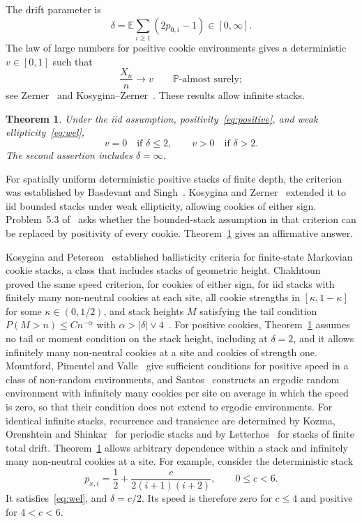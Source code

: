 \documentclass[11pt]{amsart}
\numberwithin{equation}{section}
\newtheorem{theorem}{Theorem}[section]
\theoremstyle{remark}
\newcommand{\E}{\mathbb E}
\newcommand{\Pp}{\mathbb P}
\begin{document}
The drift parameter is
\begin{equation}\label{eq:delta}
 \delta=\E\sum_{i\ge1}(2p_{0,i}-1)\in[0,\infty].
\end{equation}
The law of large numbers for positive cookie environments gives a deterministic $v\in[0,1]$ such that
\begin{equation}\label{eq:lln}
 \frac{X_n}{n}\longrightarrow v\qquad\Pp\text{-almost surely};
\end{equation}
see Zerner~\cite[Theorem~13]{Zerner05} and Kosygina--Zerner~\cite[Theorem~4.1]{KZ13}. These results allow infinite stacks.

\begin{theorem}\label{thm:main}
Under the iid assumption, positivity~\eqref{eq:positive}, and weak ellipticity~\eqref{eq:wel},
\[
 v=0\quad\text{if }\delta\le2,
 \qquad
 v>0\quad\text{if }\delta>2.
\]
The second assertion includes $\delta=\infty$.
\end{theorem}

For spatially uniform deterministic positive stacks of finite depth, the criterion was established by Basdevant and Singh~\cite{BS08}. Kosygina and Zerner~\cite[Theorem~2]{KZ08} extended it to iid bounded stacks under weak ellipticity, allowing cookies of either sign. Problem~5.3 of~\cite{KZ13} asks whether the bounded-stack assumption in that criterion can be replaced by positivity of every cookie. Theorem~\ref{thm:main} gives an affirmative answer.

Kosygina and Peterson~\cite{KP17} established ballisticity criteria for finite-state Markovian cookie stacks, a class that includes stacks of geometric height. Chakhtoun~\cite[Theorem~2.2]{Chakhtoun19} proved the same speed criterion, for cookies of either sign, for iid stacks with finitely many non-neutral cookies at each site, all cookie strengths in $[\kappa,1-\kappa]$ for some $\kappa\in(0,1/2)$, and stack heights $M$ satisfying the tail condition $P(M>n)\le Cn^{-\alpha}$ with $\alpha>|\delta|\vee4$~\cite[(2.2)]{Chakhtoun19}. For positive cookies, Theorem~\ref{thm:main} assumes no tail or moment condition on the stack height, including at $\delta=2$, and it allows infinitely many non-neutral cookies at a site and cookies of strength one. Mountford, Pimentel and Valle~\cite{MPV06} give sufficient conditions for positive speed in a class of non-random environments, and Santos~\cite{Santos19} constructs an ergodic random environment with infinitely many cookies per site on average in which the speed is zero, so that their condition does not extend to ergodic environments. For identical infinite stacks, recurrence and transience are determined by Kozma, Orenshtein and Shinkar~\cite{KOS16} for periodic stacks and by Letterhos~\cite{Letterhos21} for stacks of finite total drift. Theorem~\ref{thm:main} allows arbitrary dependence within a stack and infinitely many non-neutral cookies at a site. For example, consider the deterministic stack
\begin{equation}\label{eq:example}
 p_{x,i}=\frac12+\frac{c}{2(i+1)(i+2)},\qquad 0\le c<6.
\end{equation}
It satisfies~\eqref{eq:wel}, and $\delta=c/2$. Its speed is therefore zero for $c\le4$ and positive for $4<c<6$.
\end{document}
